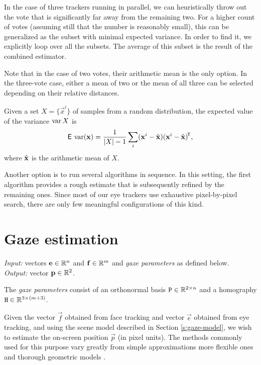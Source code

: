 In the case of three trackers running in parallel, we can heuristically throw out the vote that is significantly far away from the remaining two.
For a higher count of votes (assuming still that the number is reasonably small), this can be generalized as the subset with minimal expected variance.
In order to find it, we explicitly loop over all the subsets.
The average of this subset is the result of the combined estimator.

Note that in the case of two votes, their arithmetic mean is the only option.
In the three-vote case, either a mean of two or the mean of all three can be selected depending on their relative distances.

\begin{claim}
Given a set $X = \{\vec x^i\}$ of samples from a random distribution, the expected value of the variance $\operatorname{\mathrm{var}} X$ is
$$\operatorname{\textsf{E}\,}\operatorname{\mathrm{var}} (\mathbf{x}) = \frac 1 {|X| - 1} \sum_i (\mathbf{x}^i - \hat{\mathbf{x}})(\mathbf{x}^i - \hat{\mathbf{x}})^{\!\mathsf{T}},$$
where $\hat{\mathbf{x}}$ is the arithmetic mean of $X$.
\end{claim}

Another option is to run several algorithms in sequence.
In this setting, the first algorithm provides a rough estimate that is subsequently refined by the remaining ones.
Since most of our eye trackers use exhaustive pixel-by-pixel search, there are only few meaningful configurations of this kind.

\section{Gaze estimation}
\label{s:impl-gaze}

\textit{Input:} vectors $\mathbf{e} \in \mathbb{R}^n$ and $\mathbf{f} \in \mathbb{R}^m$ and \textit{gaze parameters} as defined below.\\
\textit{Output:} vector $\mathbf{p} \in \mathbb{R}^2$.\\

\begin{definition} \label{d:gaze-parameters}
The \textit{gaze parameters} consist of an orthonormal basis $\mathtt{P} \in \mathbb{R}^{2\times n}$ and a homography $\mathtt{H} \in \mathbb{R}^{3 \times (m+3)}$.
\end{definition}

Given the vector $\vec f$ obtained from face tracking and vector $\vec e$ obtained from eye tracking, and using the scene model described in Section \ref{s:gaze-model}, we wish to estimate the on-screen position $\vec p$ (in pixel units).
The methods commonly used for this purpose vary greatly from simple approximations \cite{zhu12} more flexible ones \cite{kassner14,yucel09} and thorough geometric models \cite{villanueva08,wang16}.

